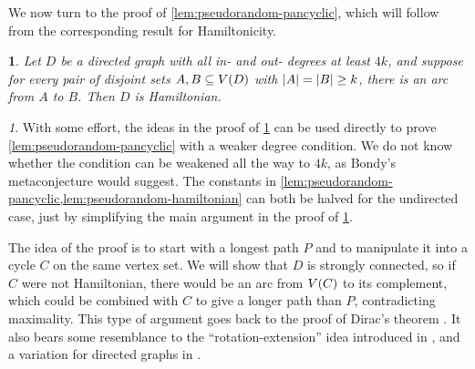 \documentclass[11pt,english]{article}
\theoremstyle{plain}
\theoremstyle{definition}
\theoremstyle{definition}
\theoremstyle{plain}
\theoremstyle{plain}
\theoremstyle{plain}
\newtheorem{lem}[thm]{\protect\lemmaname}
\theoremstyle{plain}
\theoremstyle{remark}
\newtheorem{rem}[thm]{\protect\remarkname}
\theoremstyle{remark}
\let\originalleft\left
\let\originalright\right
\renewcommand{\left}{\mathopen{}\mathclose\bgroup\originalleft}
\renewcommand{\right}{\aftergroup\egroup\originalright}
\providecommand{\lemmaname}{Lemma}
\providecommand{\remarkname}{Remark}
\begin{document}
We now turn to the proof of \ref{lem:pseudorandom-pancyclic}, which
will follow from the corresponding result for Hamiltonicity.
\begin{lem}
\label{lem:pseudorandom-hamiltonian}Let $D$ be a directed graph
with all in- and out- degrees at least $4k$, and suppose for every pair of
disjoint sets $A,B\subseteq V\left(D\right)$ with $\left|A\right|=\left|B\right|\ge k$,
there is an arc from $A$ to $B$. Then $D$ is Hamiltonian.\end{lem}
\begin{rem}
\label{rem:constants}With some effort, the ideas in the proof of
\ref{lem:pseudorandom-hamiltonian} can be used directly to prove
 \ref{lem:pseudorandom-pancyclic} with a weaker degree condition.
We do not know whether the condition can be weakened all the way to
$4k$, as Bondy's metaconjecture would suggest. The constants in \ref{lem:pseudorandom-pancyclic,lem:pseudorandom-hamiltonian}
can both be halved for the undirected case, just by simplifying the
main argument in the proof of \ref{lem:pseudorandom-hamiltonian}.

The idea of the proof is to start with a longest path $P$ and to manipulate
it into a cycle $C$ on the same vertex set. We will show that $D$
is strongly connected, so if $C$ were not Hamiltonian, there would
be an arc from $V\left(C\right)$ to its complement, which could be
combined with $C$ to give a longer path than $P$, contradicting
maximality. This type of argument goes back to the proof of Dirac's
theorem \cite[Theorem~3]{Dir52}. It also bears some resemblance to
the ``rotation-extension'' idea introduced in \cite{Pos76}, and
a variation for directed graphs in \cite[Section~4.3]{FK05}.\end{rem}
\end{document}
